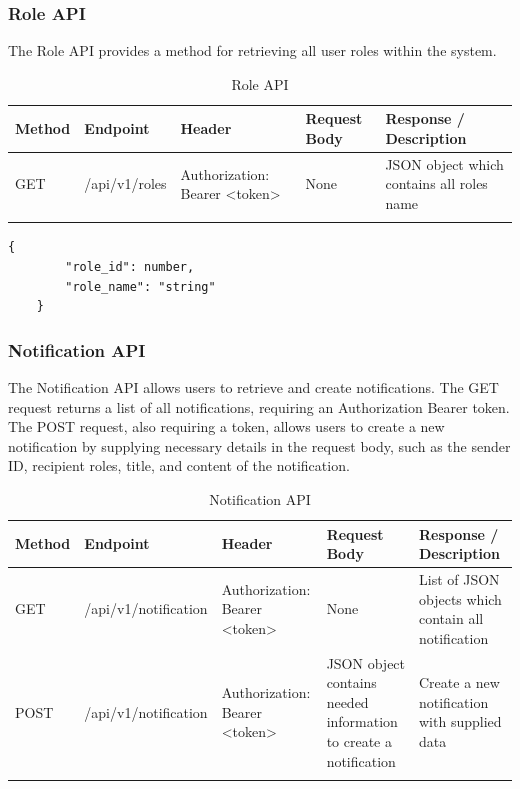 \subsubsection{Role API}
The Role API provides a method for retrieving all user roles within the system. 
	\begin{longtable}{|m{1.6cm}|m{5cm}|m{3cm}|m{3cm}|m{3cm}|}
		\hline
		\textbf{Method} & \textbf{Endpoint} & \textbf{Header}                                                                                                                            & \textbf{Request Body} & \textbf{Response / Description}   \\ \hline
		\endhead
		
		GET & /api/v1/roles & Authorization: Bearer <token>  & None & JSON object which contains all roles name\\ \hline
		
		
		\caption{Role API}
		\label{tab:role-api}
		
	\end{longtable}
	
\begin{lstlisting}[breaklines=true, caption=Role Schema]
	{
		"role_id": number,
		"role_name": "string"
	}
\end{lstlisting}	

	

\subsubsection{Notification API}
The Notification API allows users to retrieve and create notifications. The GET request returns a list of all notifications, requiring an Authorization Bearer token. The POST request, also requiring a token, allows users to create a new notification by supplying necessary details in the request body, such as the sender ID, recipient roles, title, and content of the notification.
\begin{longtable}{|m{1.6cm}|m{5cm}|m{3cm}|m{3cm}|m{3cm}|}
	\hline
	\textbf{Method} & \textbf{Endpoint} & \textbf{Header}                                                                                                                            & \textbf{Request Body} & \textbf{Response / Description}   \\ \hline
	\endhead
	
	GET & /api/v1/notification & Authorization: Bearer <token>  & None & List of JSON objects which contain all notification\\ \hline
	
	POST & /api/v1/notification & Authorization: Bearer <token>  & JSON object contains needed information to create a notification & Create a new notification with supplied data\\ \hline
	
	
	\caption{Notification API}
	\label{tab:notification-api}
	
\end{longtable}


